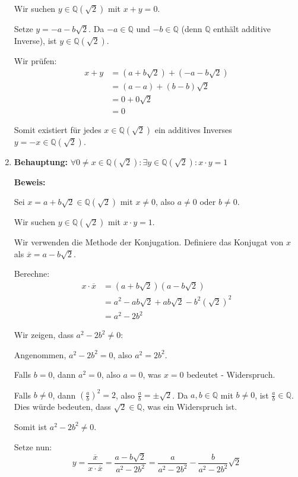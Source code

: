 \documentclass{article}
\newcommand{\Q}{\mathbb{Q}}
\newcommand{\adjunction}[2]{#1(#2)}
\newcommand{\fa}[1]{\forall #1 \colon}
\newcommand{\ex}[1]{\exists #1 \colon}
\begin{document}
\begin{enumerate}
Wir suchen \(y \in \adjunction{\Q}{\sqrt{2}}\) mit \(x + y = 0\).

Setze \(y = -a - b\sqrt{2}\). Da \(-a \in \Q\) und \(-b \in \Q\) (denn \(\Q\) enthält additive Inverse),
ist \(y \in \adjunction{\Q}{\sqrt{2}}\).

Wir prüfen:
\begin{align}
x + y &= (a + b\sqrt{2}) + (-a - b\sqrt{2})\\
&= (a - a) + (b - b)\sqrt{2}\\
&= 0 + 0\sqrt{2}\\
&= 0
\end{align}

Somit existiert für jedes \(x \in \adjunction{\Q}{\sqrt{2}}\) ein additives Inverses \(y = -x \in \adjunction{\Q}{\sqrt{2}}\).

\item \textbf{Behauptung:} \( \fa{0 \neq x \in \adjunction{\Q}{\sqrt{2}}} \ex{y \in \adjunction{\Q}{\sqrt{2}}} x \cdot y = 1\)

\textbf{Beweis:}

Sei \(x = a + b\sqrt{2} \in \adjunction{\Q}{\sqrt{2}}\) mit \(x \neq 0\), also \(a \neq 0\) oder \(b \neq 0\).

Wir suchen \(y \in \adjunction{\Q}{\sqrt{2}}\) mit \(x \cdot y = 1\).

Wir verwenden die Methode der Konjugation. Definiere das Konjugat von \(x\) als \(\overline{x} = a - b\sqrt{2}\).

Berechne:
\begin{align}
x \cdot \overline{x} &= (a + b\sqrt{2})(a - b\sqrt{2})\\
&= a^2 - ab\sqrt{2} + ab\sqrt{2} - b^2(\sqrt{2})^2\\
&= a^2 - 2b^2
\end{align}

Wir zeigen, dass \(a^2 - 2b^2 \neq 0\):

Angenommen, \(a^2 - 2b^2 = 0\), also \(a^2 = 2b^2\).

Falls \(b = 0\), dann \(a^2 = 0\), also \(a = 0\), was \(x = 0\) bedeutet - Widerspruch.

Falls \(b \neq 0\), dann \(\left(\frac{a}{b}\right)^2 = 2\), also \(\frac{a}{b} = \pm\sqrt{2}\).
Da \(a, b \in \Q\) mit \(b \neq 0\), ist \(\frac{a}{b} \in \Q\).
Dies würde bedeuten, dass \(\sqrt{2} \in \Q\), was ein Widerspruch ist.

Somit ist \(a^2 - 2b^2 \neq 0\).

Setze nun:
\[y = \frac{\overline{x}}{x \cdot \overline{x}} = \frac{a - b\sqrt{2}}{a^2 - 2b^2} = \frac{a}{a^2 - 2b^2} - \frac{b}{a^2 - 2b^2}\sqrt{2}\]


\end{enumerate}
\end{document}
